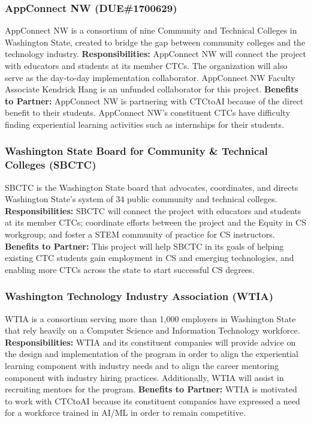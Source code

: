 \subsubsection{AppConnect NW (DUE\#1700629)}

AppConnect NW is a consortium of nine Community and Technical Colleges in Washington State, created to bridge the gap between community colleges and the technology industry. \textbf{Responsibilities:} AppConnect NW will connect the project with educators and students at its member CTCs. The organization will also serve as the day-to-day implementation collaborator. AppConnect NW Faculty Associate Kendrick Hang is an unfunded collaborator for this project.  \textbf{Benefits to Partner:} AppConnect NW is partnering with CTCtoAI because of the direct benefit to their students. AppConnect NW's constituent CTCs have difficulty finding experiential learning activities such as internships for their students.


\subsubsection{Washington State Board for Community \& Technical Colleges (SBCTC)}

SBCTC is the Washington State board that advocates, coordinates, and directs Washington State's system of 34 public community and technical colleges. \textbf{Responsibilities:} SBCTC will connect the project with educators and students at its member CTCs; coordinate efforts between the project and the Equity in CS workgroup; and foster a STEM community of practice for CS instructors. \textbf{Benefits to Partner:} This project will help SBCTC in its goals of helping existing CTC students gain employment in CS and emerging technologies, and enabling more CTCs across the state to start successful CS degrees.


\subsubsection{Washington Technology Industry Association (WTIA)}

WTIA is a consortium serving more than 1,000 employers in Washington State that rely heavily on a Computer Science and Information Technology workforce. \textbf{Responsibilities:} WTIA and its constituent companies will provide advice on the design and implementation of the program in order to align the experiential learning component with industry needs and to align the career mentoring component with industry hiring practices. Additionally, WTIA will assist in recruiting mentors for the program. \textbf{Benefits to Partner:} WTIA is motivated to work with CTCtoAI because its constituent companies have expressed a need for a workforce trained in AI/ML in order to remain competitive.


